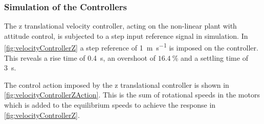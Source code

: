 \subsubsection{Simulation of the Controllers}
The z translational velocity controller, acting on the non-linear plant with attitude control, is subjected to a step input reference signal in simulation.
In \autoref{fig:velocityControllerZ} a step reference of \SI{1}{m s^{-1}} is imposed on the controller. This reveals a rise time of \SI{0.4}{s}, an overshoot of $16.4\ \%$ and a settling time of \SI{3}{s}.

The control action imposed by the z translational controller is shown in \autoref{fig:velocityControllerZAction}. This is the sum of rotational speeds in the motors which is added to the equilibrium speeds to achieve the response in \autoref{fig:velocityControllerZ}.

